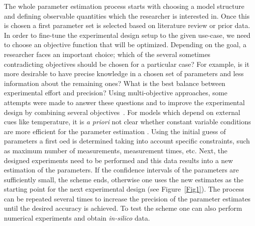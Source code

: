 \documentclass[graybox]{svmult}
\begin{document}
The whole parameter estimation process starts with choosing a model structure and defining observable quantities which the researcher is interested in.
Once this is chosen a first parameter set is selected based on literature review or prior data.
In order to fine-tune the experimental design setup to the given use-case, we need to choose an objective function that will be optimized.
Depending on the goal, a researcher faces an important choice; which of the several sometimes contradicting objectives should be chosen for a particular case?
For example, is it more desirable to have precise knowledge in a chosen set of parameters and less information about the remaining ones?
What is the best balance between experimental effort and precision?
Using multi-objective approaches, some attempts were made to answer these questions and to improve the experimental design by combining several objectives~\cite{telenOptimalExperimentDesign2012, logistRobustMultiobjectiveOptimal2011}.
For models which depend on external cues like temperature, it is {\it a priori} not clear whether constant variable conditions are more efficient for the parameter estimation \cite{versyckIntroducingOptimal1999,garciaQualityShelflifePrediction2015}.
Using the initial guess of parameters a first \ac{oed} is determined taking into account specific constraints, such as maximum number of measurements, measurement times, etc.
Next, the designed experiments need to be performed and this data results into a new estimation of the parameters.
If the confidence intervals of the parameters are sufficiently small, the scheme ends, otherwise one uses the new estimates as the starting point for the next experimental design (see Figure~\ref{Fig1}).
The process can be repeated several times to increase the precision of the parameter estimates until the desired accuracy is achieved.
To test the scheme one can also perform numerical experiments and obtain {\it in-silico} data.
%
%
%
\end{document}
